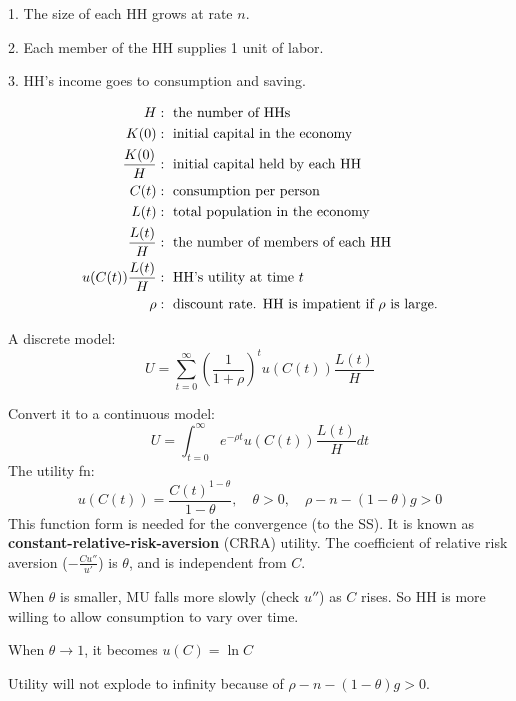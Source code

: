 \documentclass[12pt]{article}
\begin{document}
1. The size of each HH grows at rate $ n $. 

2. Each member of the HH supplies 1 unit of labor.

3. HH's income goes to consumption and saving.

\begin{align*}
H &: \text{ the number of HHs }\\
K(0)&: \text{ initial capital in the economy }\\
\frac{K(0)}{H} &: \text{ initial capital held by each HH }\\
C(t) &: \text{ consumption per person }\\
L(t) &: \text{ total population in the economy }\\
\frac{L(t)}{H} &: \text{ the number of members of each HH }\\
u(C(t))\frac{L(t)}{H} &: \text{ HH's utility at time $ t $ }\\
\rho &: \text{ discount rate. HH is impatient if $ \rho $ is large.}
\end{align*}

A discrete model:
\begin{equation*}
U = \sum\limits_{t = 0} ^\infty \left( \frac{1}{1 + \rho} \right) ^{t}
u(C(t))\frac{L(t)}{H}
\end{equation*}



Convert it to a continuous model:
\begin{equation*}
U = \int_{t = 0}^{\infty } e^{ - \rho t}u(C(t))\frac{L(t)}{H}dt
\end{equation*}
The utility fn:
\begin{equation*}
u(C(t)) = \frac{C(t)^{1 - \theta}}{1 - \theta}, \quad \theta > 0, \quad
\rho - n - (1 - \theta)g > 0
\end{equation*}
This function form is needed for the convergence (to the SS). It is known as 
{\textbf {constant-relative-risk-aversion}} (CRRA) utility.
The coefficient of relative risk aversion ($  - \frac{C u''}{u'} $) is $ \theta $,
and is independent from $ C $.

When $ \theta $ is smaller, MU falls more slowly (check $ u'' $) as $ C $ rises. So
HH is more willing to allow consumption to vary over time.

When $ \theta \rightarrow 1 $, it becomes $ u(C) = \ln C $

Utility will not explode to infinity because of  $ \rho - n - (1 - \theta)g > 0 $.
\end{document}

